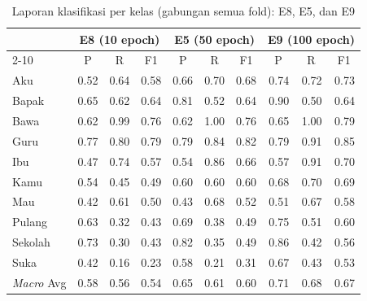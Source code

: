 \begin{table}[H]
\centering
\caption{Laporan klasifikasi per kelas (gabungan semua fold): E8, E5, dan E9}
\label{tab:4.s3_perkelas}
{\setlength{\tabcolsep}{3pt}
\footnotesize
\begin{tabular}{|l|rrr|rrr|rrr|}
\hline
\rowcolor{gray!15}\cellcolor{gray!15}\multirow{2}{*}{\textbf{Kelas}} &
  \multicolumn{3}{c|}{\cellcolor{gray!15}\textbf{E8 (10 epoch)}} &
  \multicolumn{3}{c|}{\cellcolor{gray!15}\textbf{E5 (50 epoch)}} &
  \multicolumn{3}{c|}{\cellcolor{gray!15}\textbf{E9 (100 epoch)}} \\
\cline{2-10}
 & \multicolumn{1}{c|}{P} & \multicolumn{1}{c|}{R} & \multicolumn{1}{c|}{F1} & \multicolumn{1}{c|}{P} & \multicolumn{1}{c|}{R} & \multicolumn{1}{c|}{F1} & \multicolumn{1}{c|}{P} & \multicolumn{1}{c|}{R} & \multicolumn{1}{c|}{F1} \\
\hline
Aku     & 0.52 & 0.64 & 0.58 & 0.66 & 0.70 & 0.68 & 0.74 & 0.72 & 0.73 \\
Bapak   & 0.65 & 0.62 & 0.64 & 0.81 & 0.52 & 0.64 & 0.90 & 0.50 & 0.64 \\
Bawa    & 0.62 & 0.99 & 0.76 & 0.62 & 1.00 & 0.76 & 0.65 & 1.00 & 0.79 \\
Guru    & 0.77 & 0.80 & 0.79 & 0.79 & 0.84 & 0.82 & 0.79 & 0.91 & 0.85 \\
Ibu     & 0.47 & 0.74 & 0.57 & 0.54 & 0.86 & 0.66 & 0.57 & 0.91 & 0.70 \\
Kamu    & 0.54 & 0.45 & 0.49 & 0.60 & 0.60 & 0.60 & 0.68 & 0.70 & 0.69 \\
Mau     & 0.42 & 0.61 & 0.50 & 0.43 & 0.68 & 0.52 & 0.51 & 0.67 & 0.58 \\
Pulang  & 0.63 & 0.32 & 0.43 & 0.69 & 0.38 & 0.49 & 0.75 & 0.51 & 0.60 \\
Sekolah & 0.73 & 0.30 & 0.43 & 0.82 & 0.35 & 0.49 & 0.86 & 0.42 & 0.56 \\
Suka    & 0.42 & 0.16 & 0.23 & 0.58 & 0.21 & 0.31 & 0.67 & 0.43 & 0.53 \\
\hline
\textit{Macro} Avg & 0.58 & 0.56 & 0.54 & 0.65 & 0.61 & 0.60 & 0.71 & 0.68 & 0.67 \\
\hline
\end{tabular}
}
\end{table}

